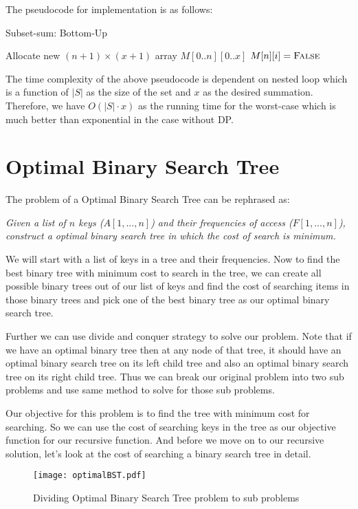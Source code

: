 \documentclass[11pt]{article}
\theoremstyle{definition}
\begin{document}
The pseudocode for implementation is as follows:
\begin{algorithm}[H]
\caption{Subset-sum: Bottom-Up}\label{Subset-sum:BU}
\begin{algorithmic}[1]
\State Allocate new $(n+1)\times (x+1)$ array $M[0..n][0..x]$
\State $M[n][i]=\Call{False}{}$
\EndFor
{}
    \EndFor
\EndFor
\State{}
\EndFunction
\end{algorithmic}
\end{algorithm}

The time complexity of the above pseudocode is dependent on nested loop which is a function of $|S|$ as the size of the set and $x$ as the desired summation. Therefore, we have $O(|S|\cdot x)$ as the running time for the worst-case which is much better than exponential in the case without DP.

\section{Optimal Binary Search Tree}
        The problem of a Optimal Binary Search Tree can be rephrased as:

    \emph{Given a list of $n$ keys ($A[1, ..., n]$) and their frequencies of access ($F[1, ..., n]$), construct a optimal binary search tree in which the cost of search is minimum.}
    
    We will start with a list of keys in a tree and their frequencies. Now to find the best binary tree with minimum cost to search in the tree, we can create all possible binary trees out of our list of keys and find the cost of searching items in those binary trees and pick one of the best binary tree as our optimal binary search tree.
    
    Further we can use divide and conquer strategy to solve our problem. Note that if we have an optimal binary tree then at any node of that tree, it should have an optimal binary search tree on its left child tree and also an optimal binary search tree on its right child tree. Thus we can break our original problem into two sub problems and use same method to solve for those sub problems.
    
    Our objective for this problem is to find the tree with minimum cost for searching. So we can use the cost of searching keys in the tree as our objective function for our recursive function. And before we move on to our recursive solution, let's look at the cost of searching a binary search tree in detail. 
    \begin{figure}[tbh]
        \centering
        \texttt{[image: optimalBST.pdf]}
        \caption{Dividing Optimal Binary Search Tree problem to sub problems}
        \label{fig:optimalBST}
    \end{figure}
    
\end{document}
